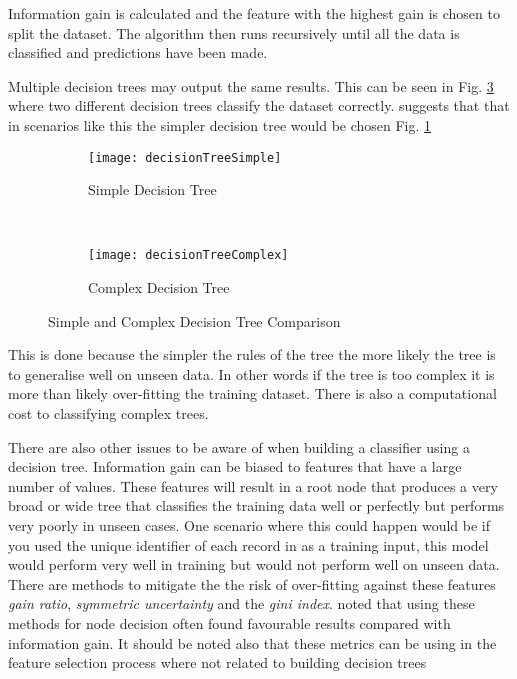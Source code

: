Information gain is calculated and the feature with the highest gain is chosen to split the dataset. The algorithm then runs recursively until all the data is classified and predictions have been made. 

Multiple decision trees may output the same results. This can be seen in Fig. \ref{fig:simpleComplex} where two different decision trees classify the dataset correctly. \cite{quinlan_induction_1986} suggests that that in scenarios like this the simpler decision tree would be chosen Fig. \ref{fig:simple}

\begin{figure}[H]
	\centering
	\begin{subfigure}[b]{0.45\textwidth}
		\captionsetup{font=scriptsize}
		\texttt{[image: decisionTreeSimple]}
		\caption{Simple Decision Tree}\label{fig:decisionTreeSimple}
		\label{fig:simple}
	\end{subfigure} ~\quad
	\begin{subfigure}[b]{0.45\textwidth}
		\captionsetup{font=scriptsize}
		\texttt{[image: decisionTreeComplex]}
		\caption{Complex Decision Tree}\label{fig:decisionTreeComplex}
		\label{fig:complex}
	\end{subfigure}
	\caption{Simple and Complex Decision Tree Comparison\\\cite[Source:][]{quinlan_induction_1986}}
	\label{fig:simpleComplex}
\end{figure}

This is done because the simpler the rules of the tree the more likely the tree is to generalise well on unseen data. In other words if the tree is too complex it is more than likely over-fitting the training dataset. There is also a computational cost to classifying complex trees. 

There are also other issues to be aware of when building a classifier using a decision tree. Information gain can be biased to features that have a large number of values. These features will result in a root node that produces a very broad or wide tree that classifies the training data well or perfectly but performs very poorly in unseen cases. One scenario where this could happen would be if you used the unique identifier of each record in as a training input, this model would perform very well in training but would not perform well on unseen data. There are methods to mitigate the the risk of over-fitting against these features \textit{gain ratio}, \textit{symmetric uncertainty} and the \textit{gini index}. \cite{quinlan_induction_1986} noted that using these methods for node decision often found favourable results compared with information gain. It should be noted also that these metrics can be using in the feature selection process where not related to building decision trees


